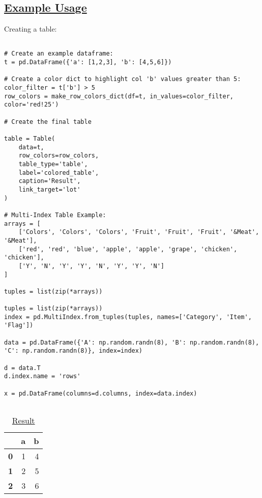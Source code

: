 \documentclass[11pt]{article}
\begin{document}
\subsection[Example Usage]{\hyperlink{toc}{Example Usage}}

Creating a table:
\begin{verbatim}

# Create an example dataframe:
t = pd.DataFrame({'a': [1,2,3], 'b': [4,5,6]})

# Create a color dict to highlight col 'b' values greater than 5:
color_filter = t['b'] > 5
row_colors = make_row_colors_dict(df=t, in_values=color_filter, color='red!25')

# Create the final table

table = Table(
    data=t,
    row_colors=row_colors,
    table_type='table',
    label='colored_table',
    caption='Result',
    link_target='lot'
)

# Multi-Index Table Example:
arrays = [
    ['Colors', 'Colors', 'Colors', 'Fruit', 'Fruit', 'Fruit', '&Meat', '&Meat'],
    ['red', 'red', 'blue', 'apple', 'apple', 'grape', 'chicken', 'chicken'],
    ['Y', 'N', 'Y', 'Y', 'N', 'Y', 'Y', 'N']
]

tuples = list(zip(*arrays))

tuples = list(zip(*arrays))
index = pd.MultiIndex.from_tuples(tuples, names=['Category', 'Item', 'Flag'])

data = pd.DataFrame({'A': np.random.randn(8), 'B': np.random.randn(8), 'C': np.random.randn(8)}, index=index)

d = data.T
d.index.name = 'rows'

x = pd.DataFrame(columns=d.columns, index=data.index)


\end{verbatim}
\begin{table}[!h]
\centering
\caption[Result]{\hyperlink{lot}{Result}}
\label{colored_table}
\begin{tabular}{lrr}
\toprule
\textbf{} & \textbf{a} & \textbf{b} \\
\midrule
\arrayrulecolor{black}\textbf{0} & 1 & 4 \\
\textbf{1} & 2 & 5 \\
\rowcolor{red!25}
\textbf{2} & 3 & 6 \\
\bottomrule
\end{tabular}
\end{table}

\clearpage
\end{document}
